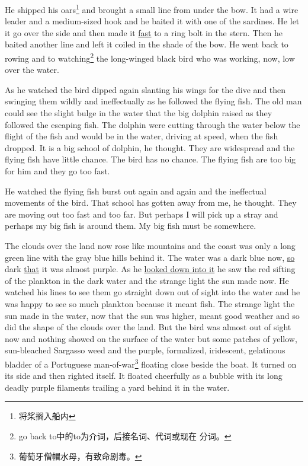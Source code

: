 \documentclass[fontset=ubuntu,zihao=-4]{ctexrep}
\newlength{\drop}%
\begin{document}
He shipped his oars\footnote{将桨搁入船内} and brought a small line from
under the bow. It had a \gls{wire} \gls{leader} and a medium-sized hook and
he baited it with one of the sardines. He let it go over the side and then
made it \uline{fast} to a ring \gls{bolt} in the stern. Then he baited
another line and left it coiled in the shade of the bow. He went back to
rowing and to watching\footnote{go back to中的to为介词，后接名词、代词或现在
  分词。} the long-winged black bird who was working, now, low over the
water.

As he watched the bird dipped again slanting his wings for the dive and then
\gls{swinging} them wildly and \gls{ineffectually} as he followed the flying fish.
The old man could see the \gls{slight} \gls{bulge} in the water that the big
dolphin raised as they followed the escaping fish. The dolphin were cutting
through the water below the flight of the fish and would be in the water,
driving at speed, when the fish dropped. It is a big school of dolphin, he
thought. They are \gls{widespread} and the flying fish have little
\gls{chance}. The bird has no chance. The flying fish are too big for him
and they go too fast.

He watched the flying fish \gls{burst} out again and again and the
\gls{ineffectual} movements of the bird. That school has gotten away from
me, he thought. They are moving out too fast and too far. But perhaps I will
pick up a \gls{stray} and perhaps my big fish is around them. My big fish must be
somewhere.

The clouds over the land now rose like mountains and the coast was only a
long green line with the gray blue hills behind it. The water was a dark
blue now, \uline{so} dark \uline{that} it was almost purple. As he \uline{looked down into it}
he saw the red sifting of the \gls{plankton} in the dark water and the
strange light the sun made now. He watched his lines to see them go straight
down out of sight into the water and he was happy to see so much plankton
because it \gls{meant} fish. The strange light the sun made in the water,
now that the sun was higher, meant good weather and so did the shape of the
clouds over the land. But the bird was almost out of sight now and nothing
showed on the surface of the water but some patches of yellow,
sun-\gls{bleached} \gls{Sargasso} \gls{weed} and the purple,
\gls{formalized}, \gls{iridescent}, \gls{gelatinous} \gls{bladder} of a
Portuguese man-of-war\footnote{葡萄牙僧帽水母，有致命剧毒。} floating close
beside the boat. It turned on its side and then righted itself. It floated
cheerfully as a \gls{bubble} with its long deadly purple \glspl{filament}
\gls{trailing} a \gls{yard} behind it in the water.
\end{document}
